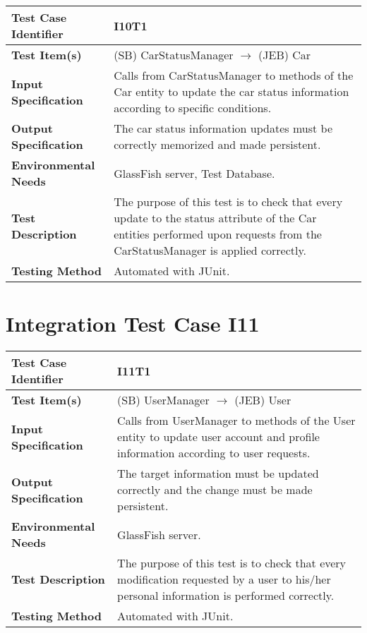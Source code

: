 \begin{longtable}{p{} | p{}}
\hline
\textbf{Test Case Identifier} & I10T1\\
\hline
\textbf{Test Item(s)} & (SB) CarStatusManager $\rightarrow$ (JEB) Car \\
\hline
\textbf{Input Specification} & Calls from CarStatusManager to methods of the Car entity to update the car status information according to specific conditions.\\
\hline
\textbf{Output Specification} & The car status information updates must be correctly memorized and made persistent. \\
\hline
\textbf{Environmental Needs} & GlassFish server, Test Database. \\
\hline
\textbf{Test Description} & The purpose of this test is to check that every update to the status attribute of the Car entities performed upon requests from the CarStatusManager is applied correctly. \\
\hline
\textbf{Testing Method} & Automated with JUnit. \\
\hline
\end{longtable}

\section{Integration Test Case I11}

\begin{longtable}{p{} | p{}}
\hline
\textbf{Test Case Identifier} & I11T1\\
\hline
\textbf{Test Item(s)} & (SB) UserManager $\rightarrow$ (JEB) User \\
\hline
\textbf{Input Specification} & Calls from UserManager to methods of the User entity to update user account and profile information according to user requests. \\
\hline
\textbf{Output Specification} & The target information must be updated correctly and the change must be made persistent. \\
\hline
\textbf{Environmental Needs} & GlassFish server. \\
\hline
\textbf{Test Description} & The purpose of this test is to check that every modification requested by a user to his/her personal information is performed correctly. \\
\hline
\textbf{Testing Method} & Automated with JUnit. \\
\hline
\end{longtable}

